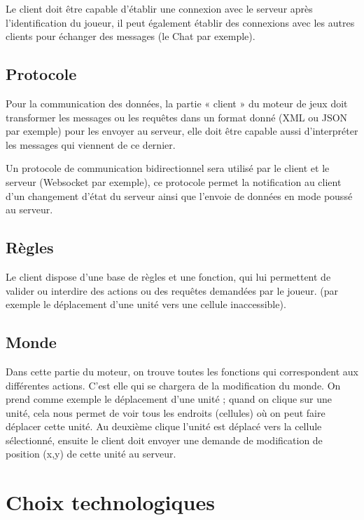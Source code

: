 \documentclass[a4paper,10pt]{report}
\begin{document}
	Le client doit être capable d’établir une connexion avec le serveur après l’identification du joueur, il peut également établir des connexions avec les autres clients pour échanger des messages (le Chat par exemple).

      \subsection{Protocole}

	Pour la communication des données, la partie « client » du moteur de jeux doit transformer les messages ou les requêtes dans un format donné (XML ou JSON par exemple) pour les envoyer au serveur, elle doit être capable aussi d’interpréter les messages qui viennent de ce dernier.

	Un protocole de communication bidirectionnel sera utilisé par le client et le serveur (Websocket par exemple), ce protocole permet la notification au client d’un changement d’état du serveur ainsi que l’envoie de données en mode poussé au serveur.

      \subsection{Règles}

	Le client dispose d’une base de règles et une fonction, qui lui permettent de valider ou interdire des actions ou des requêtes demandées par le joueur. (par exemple le déplacement d’une unité vers une cellule inaccessible).

      \subsection{Monde}

	Dans cette partie du moteur, on trouve toutes les fonctions qui correspondent aux différentes actions. C'est elle qui se chargera de la modification du monde. On prend comme exemple le déplacement d’une unité ; quand on clique sur une unité, cela nous permet de voir tous les endroits (cellules) où on peut faire déplacer cette unité. Au deuxième clique l’unité est déplacé vers la cellule sélectionné, ensuite le client doit envoyer une demande de modification de position (x,y) de cette unité au serveur.


    \section{Choix technologiques}
\end{document}
